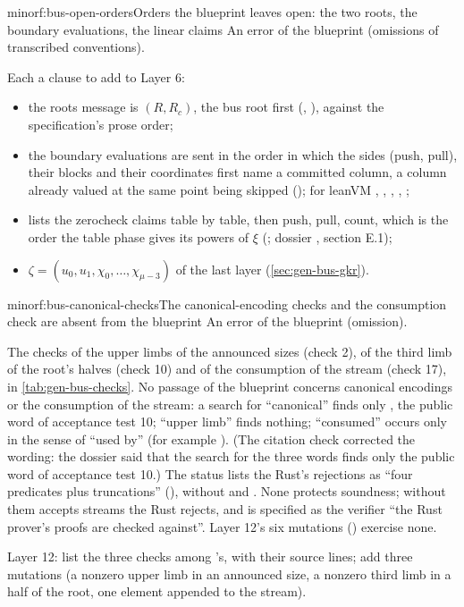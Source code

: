 \begin{finding}{minor}{f:bus-open-orders}{Orders the blueprint leaves open: the two roots, the boundary evaluations, the linear claims}
 An error of the blueprint (omissions of transcribed conventions).

 Each a clause to add to Layer 6:
\begin{itemize}
\item the roots message is $(R, R_c)$, the bus root first (, ),
  against the specification's prose order;
\item the boundary evaluations are sent in the order in which the sides (push, pull), their blocks
  and their coordinates first name a committed column, a column already valued at the same point
  being skipped (); for leanVM , ,
  , , ;
\item {} lists the zerocheck claims table by table, then push, pull, count, which
  is the order the table phase gives its powers of $ξ$ (; dossier ,
  section E.1);
\item $ζ = (u_0, u_1, χ_0, …, χ_{μ−3})$ of the last layer (\cref{sec:gen-bus-gkr}).
\end{itemize}
\end{finding}

\begin{finding}{minor}{f:bus-canonical-checks}{The canonical-encoding checks and the consumption check are absent from the blueprint}
 An error of the blueprint (omission).

 The checks of the upper limbs of the announced sizes (check 2), of the third limb of
the root's halves (check 10) and of the consumption of the stream (check 17), in \cref{tab:gen-bus-checks}.
No passage of the blueprint concerns canonical encodings or the consumption of the stream: a
search for ``canonical'' finds only , the public word of acceptance test 10;
``upper limb'' finds nothing; ``consumed'' occurs only in the sense of ``used by'' (for example
). (The citation check corrected the wording: the dossier said that the
search for the three words finds only the public word of acceptance test 10.) The status lists
the Rust's rejections as ``four predicates plus truncations'' (), without
 and . None protects soundness; without them
 accepts streams the Rust rejects, and  is specified as the verifier
``the Rust prover's proofs are checked against''. Layer 12's six mutations ()
exercise none.

 Layer 12: list the three checks among 's, with their source
lines; add three mutations (a nonzero upper limb in an announced size, a nonzero third limb in a
half of the root, one element appended to the stream).
\end{finding}

